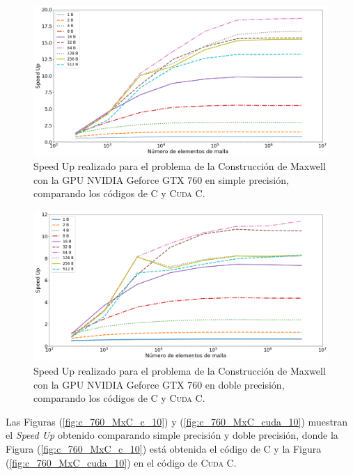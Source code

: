 \begin{figure}[htbp]
	\centering
	\includegraphics[width=\textwidth]{figs/cap4/s_760_MxC_simple_10}
	\caption{Speed Up realizado para el problema de la Construcción de Maxwell con la GPU NVIDIA Geforce GTX 760 en simple precisión, comparando los códigos de \textsc{C} y \textsc{Cuda C}.} 
	\label{fig:s_760_MxC_simple_1.0}	
\end{figure}

\begin{figure}[htbp]
	\centering
	\includegraphics[width=\textwidth]{figs/cap4/s_760_MxC_double_10}
	\caption{Speed Up realizado para el problema de la Construcción de Maxwell con la GPU NVIDIA Geforce GTX 760 en doble precisión, comparando los códigos de \textsc{C} y \textsc{Cuda C}.} 
	\label{fig:s_760_MxC_double_1.0}	
\end{figure}

\newpage

Las Figuras (\ref{fig:c_760_MxC_c_10}) y (\ref{fig:c_760_MxC_cuda_10}) muestran el \textit{Speed Up} obtenido comparando simple precisión y doble precisión, donde la Figura (\ref{fig:c_760_MxC_c_10}) está obtenida el código de \textsc{C} y la Figura (\ref{fig:c_760_MxC_cuda_10}) en el código de \textsc{Cuda C}. 

